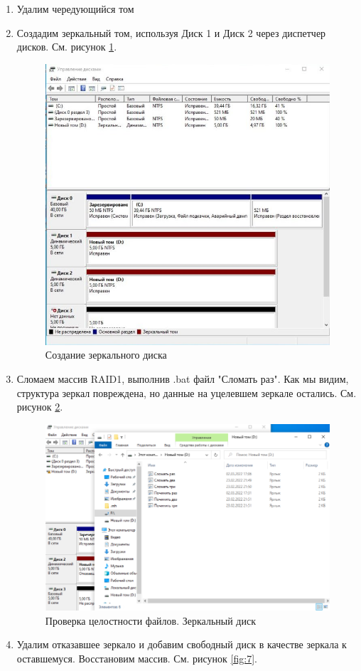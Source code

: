 \documentclass[a4paper,14pt]{extarticle}
\begin{document}
\begin{enumerate}
		\item Удалим чередующийся том
		\item Создадим зеркальный том, используя Диск 1 и Диск 2 через диспетчер дисков. См. рисунок \ref{fig:5}.
		\begin{figure}[h!]
			\centering
			\includegraphics[width=0.5\linewidth]{5}
			\caption{Создание зеркального диска}
			\label{fig:5}
		\end{figure}
	\newpage
\item Сломаем массив RAID1, выполнив .bat файл "Сломать раз". Как мы видим, структура зеркал повреждена, но данные на уцелевшем зеркале остались.	См. рисунок \ref{fig:last2}.

\begin{figure}[h!]
	\centering
	\includegraphics[width=0.7\linewidth]{last2}
	\caption{Проверка целостности файлов. Зеркальный диск}
	\label{fig:last2}
\end{figure}

		\item Удалим отказавшее зеркало и добавим свободный диск в качестве зеркала к оставшемуся. Восстановим массив. См. рисунок \ref{fig:7}.
		
		

\end{enumerate}
\end{document}
